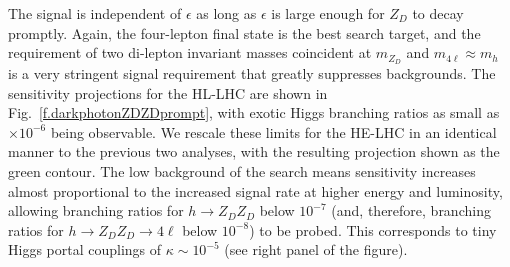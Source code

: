 The signal is independent of $\epsilon$ as long as $\epsilon$ is large enough for $Z_D$ to decay promptly. 
%
Again, the four-lepton final state is the best search target, and the requirement of two di-lepton invariant masses coincident at $m_{Z_D}$ and $m_{4 \ell} \approx m_h$ is a very stringent signal requirement that greatly suppresses backgrounds. 
%
The sensitivity projections for the HL-LHC are shown in Fig.~\ref{f.darkphotonZDZDprompt}, with exotic Higgs branching ratios as small as $\times 10^{-6}$ being observable. 
%
We rescale these limits for the HE-LHC in an identical manner to the previous two analyses, with the resulting projection shown as the green contour. The low background of the search means sensitivity increases almost proportional to the increased signal rate at higher energy and luminosity, allowing branching ratios for $h\to Z_D Z_D$ below $10^{-7}$ (and, therefore, branching ratios for $h\to Z_D Z_D\to 4\ell$ below $10^{-8}$) to be probed. This corresponds to tiny Higgs portal couplings of $\kappa \sim 10^{-5}$ (see right panel of the figure). 


